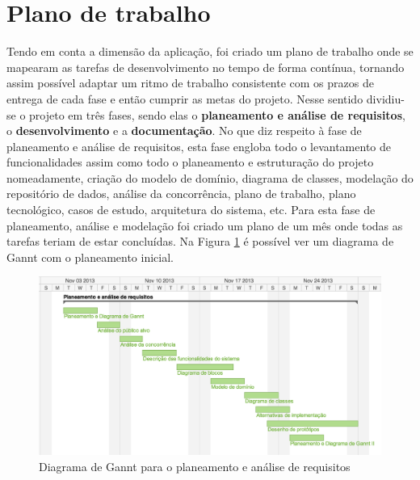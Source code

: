 \section{Plano de trabalho}
Tendo em conta a dimensão da aplicação, foi criado um plano de trabalho onde se mapearam as tarefas
de desenvolvimento no tempo de forma contínua, tornando assim possível adaptar um ritmo de trabalho
consistente com os prazos de entrega de cada fase e então cumprir as metas do projeto.
Nesse sentido dividiu-se o projeto em três fases, sendo elas o \textbf{planeamento e análise de requisitos}, o
\textbf{desenvolvimento} e a \textbf{documentação}.
No que diz respeito à fase de planeamento e análise de requisitos, esta fase engloba todo o levantamento 
de funcionalidades assim como todo o planeamento e estruturação do projeto 
nomeadamente, criação do modelo de domínio, diagrama de classes, modelação do repositório de dados,
análise da concorrência, plano de trabalho, plano tecnológico, casos de estudo, arquitetura do sistema, etc.
Para esta fase de planeamento, análise e modelação foi criado um plano de um mês onde todas as tarefas 
teriam de estar concluídas. Na Figura \ref{fig: workplan1} é possível ver um diagrama de Gannt com
o planeamento inicial.

\begin{figure}[htbp] 
  \centering
  \includegraphics[width=1\textwidth]{images/plano_de_trabalho/gannt_1.png}
  \caption{Diagrama de Gannt para o planeamento e análise de requisitos}
  \label{fig: workplan1}
\end{figure}

